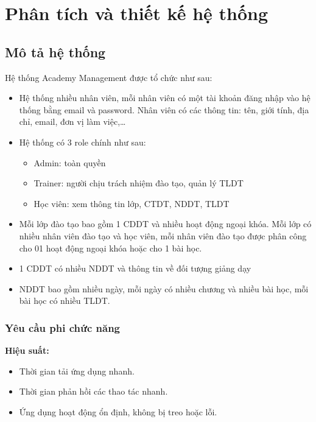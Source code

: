\documentclass[report.tex]{subfiles}
\begin{document}
\pagebreak

\chapter[Chương 2. Phân tích và thiết kế hệ thống]{Phân tích và thiết kế hệ thống}

\section{Mô tả hệ thống}

Hệ thống Academy Management được tổ chức như sau:

\begin{itemize}[noitemsep]
\item Hệ thống nhiều nhân viên, mỗi nhân viên có một tài khoản đăng nhập vào hệ thống bằng email và password.
Nhân viên có các thông tin: tên, giới tính, địa chỉ, email, đơn vị làm việc,\dots
\item Hệ thống có 3 role chính như sau:
\begin{itemize}[noitemsep]
\item Admin: toàn quyền
\item Trainer: người chịu trách nhiệm đào tạo, quản lý TLDT
\item Học viên: xem thông tin lớp, CTDT, NDDT, TLDT
\end{itemize}

\item Mỗi lớp đào tạo bao gồm 1 CDDT và nhiều hoạt động ngoại khóa.
Mỗi lớp có nhiều nhân viên đào tạo và học viên, mỗi nhân viên đào tạo được phân công cho 01 hoạt động ngoại khóa hoặc cho 1 bài học.

\item 1 CDDT có nhiều NDDT và thông tin về đối tượng giảng dạy
\item NDDT bao gồm nhiều ngày, mỗi ngày có nhiều chương và nhiều bài học, mỗi bài học có nhiều TLDT.
\end{itemize}

\subsection{Yêu cầu phi chức năng}

\textbf{Hiệu suất:}
\begin{itemize}[noitemsep]
\item Thời gian tải ứng dụng nhanh.
\item Thời gian phản hồi các thao tác nhanh.
\item Ứng dụng hoạt động ổn định, không bị treo hoặc lỗi.
\end{itemize}
\end{document}
